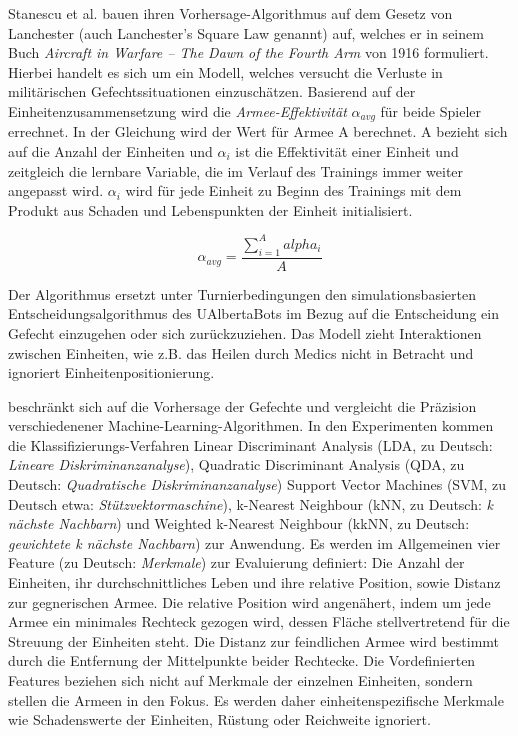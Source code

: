 Stanescu et al. \textcite{AIIDE1511531} bauen ihren Vorhersage-Algorithmus auf dem Gesetz von Lanchester (auch Lanchester's Square Law genannt) auf, welches er in seinem Buch \textit{ Aircraft in Warfare – The Dawn of the Fourth Arm} von 1916 formuliert. Hierbei handelt es sich um ein Modell, welches versucht die Verluste in militärischen Gefechtssituationen  einzuschätzen. Basierend auf der Einheitenzusammensetzung wird die \textit{Armee-Effektivität} $\alpha_{avg}$ für beide Spieler errechnet. In der Gleichung wird der Wert für Armee A berechnet. A bezieht sich auf die Anzahl der Einheiten und $\alpha_i$ ist die Effektivität einer Einheit und zeitgleich die lernbare Variable, die im Verlauf des Trainings immer weiter angepasst wird. $\alpha_i$ wird für jede Einheit zu Beginn des Trainings mit dem Produkt aus Schaden und Lebenspunkten der Einheit initialisiert.

\begin{equation}
	\alpha_{avg} = \frac{\sum_{i=1}^A alpha_i}{A}
\end{equation}

Der Algorithmus ersetzt unter Turnierbedingungen den simulationsbasierten Entscheidungsalgorithmus des UAlbertaBots im Bezug auf die Entscheidung ein Gefecht einzugehen oder sich zurückzuziehen. Das Modell zieht Interaktionen zwischen Einheiten, wie z.B. das Heilen durch Medics nicht in Betracht und ignoriert Einheitenpositionierung.  

\textcite{SnchezRuizGranados2015PredictingTO} beschränkt sich auf die Vorhersage der Gefechte und vergleicht die Präzision verschiedenener Machine-Learning-Algorithmen. In den Experimenten kommen die Klassifizierungs-Verfahren Linear Discriminant Analysis (LDA, zu Deutsch: \textit{Lineare Diskriminanzanalyse}), Quadratic Discriminant Analysis (QDA, zu Deutsch: \textit{Quadratische Diskriminanzanalyse}) Support Vector Machines (SVM, zu Deutsch etwa: \textit{Stützvektormaschine}), k-Nearest Neighbour (kNN, zu Deutsch: \textit{k nächste Nachbarn}) und Weighted k-Nearest Neighbour (kkNN, zu Deutsch: \textit{gewichtete k nächste Nachbarn}) zur Anwendung. Es werden im Allgemeinen vier Feature (zu Deutsch: \textit{Merkmale}) zur Evaluierung definiert: Die Anzahl der Einheiten, ihr durchschnittliches Leben und ihre relative Position, sowie Distanz zur gegnerischen Armee. Die relative Position wird angenähert, indem um jede Armee ein minimales Rechteck gezogen wird, dessen Fläche stellvertretend für die Streuung der Einheiten steht. Die Distanz zur feindlichen Armee wird bestimmt durch die Entfernung der Mittelpunkte beider Rechtecke. Die Vordefinierten Features beziehen sich nicht auf Merkmale der einzelnen Einheiten, sondern stellen die Armeen in den Fokus. Es werden daher einheitenspezifische Merkmale wie Schadenswerte der Einheiten, Rüstung oder Reichweite ignoriert.

